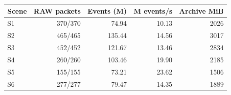 \begin{tabular}{lrrrr}
\toprule
Scene & RAW packets & Events (M) & M events/s & Archive MiB \\
\midrule
S1 & 370/370 & 74.94 & 10.13 & 2026 \\
S2 & 465/465 & 135.44 & 14.56 & 3017 \\
S3 & 452/452 & 121.67 & 13.46 & 2834 \\
S4 & 260/260 & 103.46 & 19.90 & 2185 \\
S5 & 155/155 & 73.21 & 23.62 & 1506 \\
S6 & 277/277 & 79.47 & 14.35 & 1889 \\
\bottomrule
\end{tabular}
